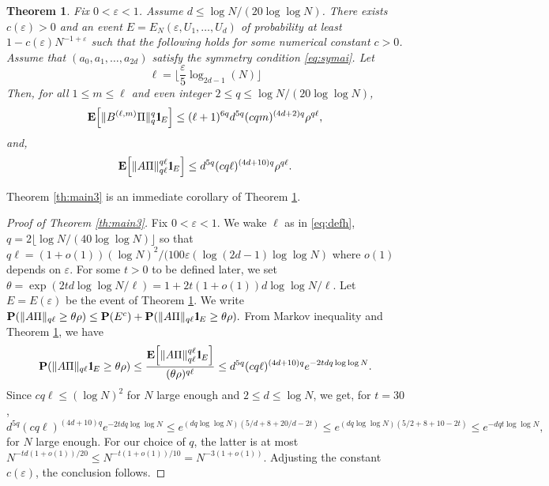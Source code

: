 \documentclass[11pt]{article}
\newtheorem{theorem}[lemma]{Theorem}
\newcommand{\dE}{\mathbf {E}}
\newcommand{\dP}{\mathbf{P}}
\newcommand{\SBRA}[1]{{{\left[#1\right]}}} %
\newcommand{\1}{1\!\!{\sf I}}
\newcommand{\IND}{\1}
\newcommand{\veps}{\varepsilon}
\begin{document}
\begin{theorem}\label{th:FKBlmP}
Fix $0 < \veps < 1$. Assume $d \leq \log N / (20 \log \log N)$. There exists $c(\veps) >0$ and an event $E = E_N( \veps, U_1,\ldots,U_d)$ of probability at least $1- c(\veps) N^{-1+\veps}$ such that the following holds for some numerical constant $c >0$. 
Assume that $(a_0,a_1,\ldots,a_{2d})$ satisfy  the symmetry condition \eqref{eq:symai}.  
Let 
\begin{equation}\label{eq:defh}
\ell = \lfloor \frac{ \veps}{5} \log _{2d -1} (N) \rfloor 
\end{equation}
Then, for all $1 \leq m \leq \ell$ and even integer $2 \leq q \leq \log N / (20 \log \log N)$, 
$$
\dE \SBRA{\|  B^{(\ell,m)} \Pi  \|_{q} ^{q}  \IND_{E} }\leq (\ell+1)^{6q}   d^{5q}  ( c qm)^{(4d +2)q} \rho^{q \ell} ,
$$
and, 
$$
\dE \SBRA{ \| A \Pi\|_{q\ell}^{q\ell } \IND_E } \leq   d^{5q}  ( c q \ell)^{(4d +10)q} \rho^{q \ell}.
$$
\end{theorem}

Theorem \ref{th:main3} is an immediate corollary of Theorem  \ref{th:FKBlmP}. 

\begin{proof}[Proof of Theorem \ref{th:main3}]
Fix $0 < \veps < 1$. We wake $\ell$ as in \eqref{eq:defh}, $q = 2  \lfloor \log N / (40 \log \log N)\rfloor$ so that $q \ell = ( 1+o(1)) (\log N)^2 / (100 \veps (\log (2d -1) \log \log N)$ where $o(1)$ depends on $\veps$.  For some $ t  > 0$ to be defined later, we set $\theta = \exp ( 2t d \log \log N / \ell) = 1 + 2t (1 + o(1)) d \log \log N / \ell$.  Let $E = E(\veps)$ be the event of Theorem \ref{th:FKBlmP}. We write
$
\dP ( \| A \Pi\|_{q\ell} \geq \theta \rho ) \leq \dP ( E^c) + \dP ( \| A \Pi\|_{q\ell} \IND_{E} \geq \theta \rho ). 
$
From Markov inequality and Theorem \ref{th:FKBlmP}, we have 
$$
\dP ( \| A \Pi\|_{q\ell} \IND_{E} \geq \theta \rho ) \leq \frac{\dE \SBRA{ \| A \Pi\|_{q\ell}^{q\ell } \IND_E } }{ (\theta \rho ) ^{q\ell}} \leq  d^{5q}  ( c q \ell)^{(4d +10)q} e^{ - 2t d q \log \log N } .
$$
Since $c q\ell \leq (\log N)^2$ for $N$ large enough and $2 \leq d \leq \log N$, we get, for $ t  = 30$, 
$$
d^{5q}  ( c q \ell)^{(4d +10)q} e^{ - 2t d q \log \log N }  \leq e^{(dq \log \log N) ( 5/d  + 8 + 20 / d - 2 t )}  \leq e^{(dq \log \log N) ( 5/2  +  8 + 10 - 2 t )}\leq  e^{ - dq t \log \log N},
$$ 
for $N$ large enough. For our choice of $q$, the latter is at most $N^{-td (1+o(1))/20 } \leq N^{-t ( 1+ o(1)) / 10}  =  N^{-3( 1 + o(1))}$.  Adjusting the constant $c(\veps)$, the conclusion follows.
\end{proof}
\end{document}

